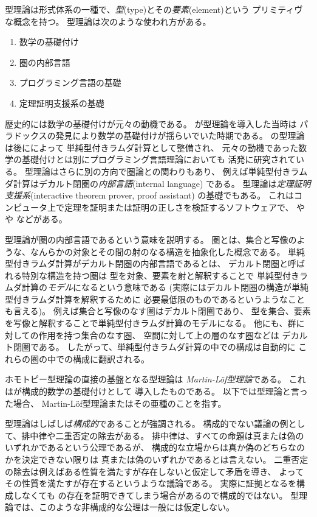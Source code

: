 \documentclass[index]{subfiles}
\begin{document}

型理論は形式体系の一種で、\emph{型}(type)とその\emph{要素}(element)という
プリミティヴな概念を持つ。
型理論は次のような使われ方がある。
\begin{enumerate}
\item 数学の基礎付け
\item 圏の内部言語
\item プログラミング言語の基礎
\item 定理証明支援系の基礎
\end{enumerate}

歴史的には数学の基礎付けが元々の動機である。
が型理論を導入した当時は
パラドックスの発見により数学の基礎付けが揺らいでいた時期である。
の型理論は後にによって
単純型付きラムダ計算として整備され、
元々の動機であった数学の基礎付けとは別にプログラミング言語理論においても
活発に研究されている。
型理論はさらに別の方向で圏論との関わりもあり、
例えば単純型付きラムダ計算はデカルト閉圏の\emph{内部言語}(internal language)
である。
型理論は\emph{定理証明支援系}(interactive theorem prover, proof assistant)
の基礎でもある。
これはコンピュータ上で定理を証明または証明の正しさを検証するソフトウェアで、
や
や
などがある。

型理論が圏の内部言語であるという意味を説明する。
圏とは、集合と写像のような、なんらかの対象とその間の射のなる構造を抽象化した概念である。
単純型付きラムダ計算がデカルト閉圏の内部言語であるとは、
デカルト閉圏と呼ばれる特別な構造を持つ圏は
型を対象、要素を射と解釈することで
単純型付きラムダ計算の\emph{モデル}になるという意味である
(実際にはデカルト閉圏の構造が単純型付きラムダ計算を解釈するために
必要最低限のものであるというようなことも言える)。
例えば集合と写像のなす圏はデカルト閉圏であり、
型を集合、要素を写像と解釈することで単純型付きラムダ計算のモデルになる。
他にも、群に対しての作用を持つ集合のなす圏、
空間に対して上の層のなす圏などは
デカルト閉圏である。
したがって、単純型付きラムダ計算の中での構成は自動的に
これらの圏の中での構成に翻訳される。

ホモトピー型理論の直接の基盤となる型理論は
\emph{Martin-Löf型理論}である。
これはが構成的数学の基礎付けとして
導入したものである。
以下では型理論と言った場合、
Martin-Löf型理論またはその亜種のことを指す。

型理論はしばしば\emph{構成的}であることが強調される。
構成的でない議論の例として、排中律や二重否定の除去がある。
排中律は、すべての命題は真または偽のいずれかであるという公理であるが、
構成的な立場からは真か偽のどちらなのかを決定できない限りは
真または偽のいずれかであるとは言えない。
二重否定の除去は例えばある性質を満たすが存在しないと仮定して矛盾を導き、
よってその性質を満たすが存在するというような議論である。
実際に証拠となるを構成しなくても
の存在を証明できてしまう場合があるので構成的ではない。
型理論では、このような非構成的な公理は一般には仮定しない。
\end{document}
